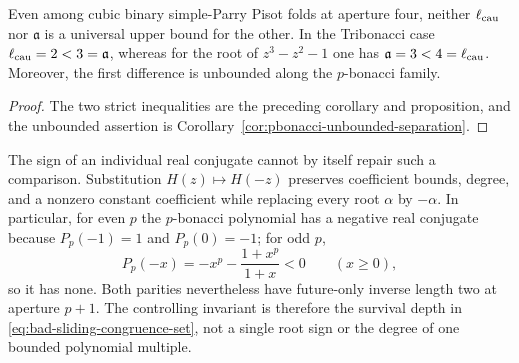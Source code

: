 \begin{corollary}
\label{cor:no-bounded-order-causal-comparison}
Even among cubic binary simple-Parry Pisot folds at aperture four, neither
$\ell_{\rm cau}$ nor $\mathfrak a$ is a universal upper bound for the other.
In the Tribonacci case $\ell_{\rm cau}=2<3=\mathfrak a$, whereas for the
root of $z^3-z^2-1$ one has $\mathfrak a=3<4=\ell_{\rm cau}$.
Moreover, the first difference is unbounded along the $p$-bonacci family.
\end{corollary}

\begin{proof}
The two strict inequalities are the preceding corollary and proposition, and
the unbounded assertion is Corollary~\ref{cor:pbonacci-unbounded-separation}.
\end{proof}

The sign of an individual real conjugate cannot by itself repair such a
comparison.  Substitution $H(z)\mapsto H(-z)$ preserves coefficient bounds,
degree, and a nonzero constant coefficient while replacing every root
$\alpha$ by $-\alpha$.  In particular, for even $p$ the $p$-bonacci
polynomial has a negative real conjugate because $P_p(-1)=1$ and
$P_p(0)=-1$; for odd $p$,
\[
P_p(-x)=-x^p-\frac{1+x^p}{1+x}<0\qquad(x\ge0),
\]
so it has none.  Both parities nevertheless have future-only inverse length two at
aperture $p+1$.  The controlling invariant is therefore the survival depth
in \eqref{eq:bad-sliding-congruence-set}, not a single root sign or the degree
of one bounded polynomial multiple.
